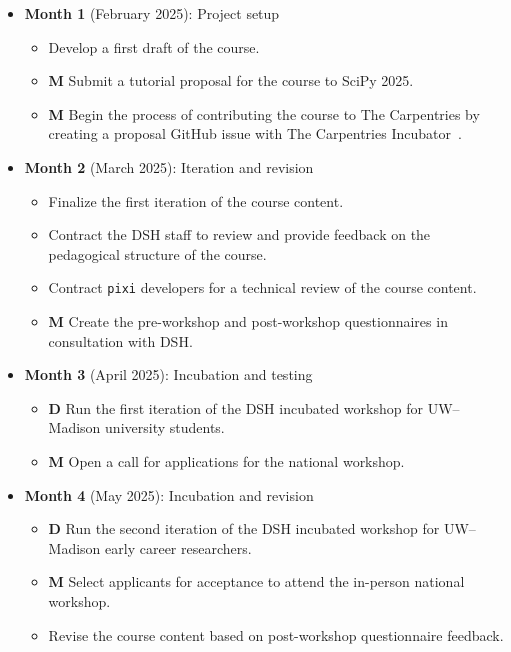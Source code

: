 \documentclass[letterpaper, 11pt]{article}
\newcommand{\institute}{UW--Madison}
\newcommand{\pixi}{\texttt{pixi}}
\newcommand{\milestone}{\textbf{\textrm{M}}}
\newcommand{\deliverable}{\textbf{\textrm{D}}}
\begin{document}
\begin{itemize}
  \item \textbf{Month 1} (February 2025): Project setup
    \begin{itemize}
      \item Develop a first draft of the course.
      \item \milestone{} Submit a tutorial proposal for the course to SciPy 2025.
      \item \milestone{} Begin the process of contributing the course to The Carpentries by creating a proposal GitHub issue with The Carpentries Incubator~\cite{carpentries_incubator_proposals}.
    \end{itemize}
  \item \textbf{Month 2} (March 2025): Iteration and revision
    \begin{itemize}
      \item Finalize the first iteration of the course content.
      \item Contract the DSH staff to review and provide feedback on the pedagogical structure of the course.
      \item Contract \pixi{} developers for a technical review of the course content.
      \item \milestone{} Create the pre-workshop and post-workshop questionnaires in consultation with DSH.
    \end{itemize}
  \item \textbf{Month 3} (April 2025): Incubation and testing
    \begin{itemize}
      \item \deliverable{} Run the first iteration of the DSH incubated workshop for \institute{} university students.
      \item \milestone{} Open a call for applications for the national workshop.
    \end{itemize}
  \item \textbf{Month 4} (May 2025): Incubation and revision
    \begin{itemize}
      \item \deliverable{} Run the second iteration of the DSH incubated workshop for \institute{} early career researchers.
      \item \milestone{} Select applicants for acceptance to attend the in-person national workshop.
      \item Revise the course content based on post-workshop questionnaire feedback.
    \end{itemize}

\end{itemize}
\end{document}
